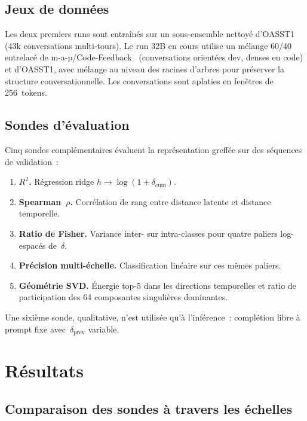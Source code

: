 \documentclass[10pt,twocolumn,letterpaper]{article}
\begin{document}
\subsection{Jeux de données}

Les deux premiers runs sont entraînés sur un sous-ensemble nettoyé d'OASST1~\cite{kopf2023oasst1} (43k conversations multi-tours). Le run 32B en cours utilise un mélange 60/40 entrelacé de m-a-p/Code-Feedback~\cite{zheng2024opencodeinterpreter} (conversations orientées dev, denses en code) et d'OASST1, avec mélange au niveau des racines d'arbres pour préserver la structure conversationnelle. Les conversations sont aplaties en fenêtres de 256~tokens.

\subsection{Sondes d'évaluation}

Cinq sondes complémentaires évaluent la représentation greffée sur des séquences de validation~:
\begin{enumerate}[leftmargin=0.6cm, itemsep=1pt]
    \item \textbf{$R^2$.} Régression ridge $h \to \log(1+\delta_{\text{cum}})$.
    \item \textbf{Spearman~$\rho$.} Corrélation de rang entre distance latente et distance temporelle.
    \item \textbf{Ratio de Fisher.} Variance inter- sur intra-classes pour quatre paliers log-espacés de~$\delta$.
    \item \textbf{Précision multi-échelle.} Classification linéaire sur ces mêmes paliers.
    \item \textbf{Géométrie SVD.} Énergie top-5 dans les directions temporelles et ratio de participation des 64 composantes singulières dominantes.
\end{enumerate}

Une sixième sonde, qualitative, n'est utilisée qu'à l'inférence~: complétion libre à prompt fixe avec~$\delta_{\text{prev}}$ variable.

\section{Résultats}

\subsection{Comparaison des sondes à travers les échelles}
\end{document}

